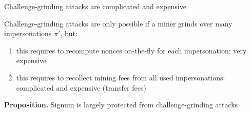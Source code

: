 \documentclass[11pt]{beamer}  %
\begin{document}
\addtocounter{framenumber}{-1}

\begin{frame}{Challenge-grinding attacks are complicated and expensive}

  \begin{center}
  \end{center}

  Challenge-grinding attacks are only possible if a miner grinds over many impersonations $\pi'$, but:

  \begin{enumerate}
    \pause
  \item this requires to recompute nonces on-the-fly for each impersonation: very expensive
    \pause
  \item this requires to recollect mining fees from all used impersonations: complicated
    and expensive (transfer fees)
  \end{enumerate}

  \pause
  \begin{center}
    \textbf{Proposition.} Signum is largely protected from challenge-grinding attacks
  \end{center}

\end{frame}

\addtocounter{framenumber}{-1}
\end{document}

